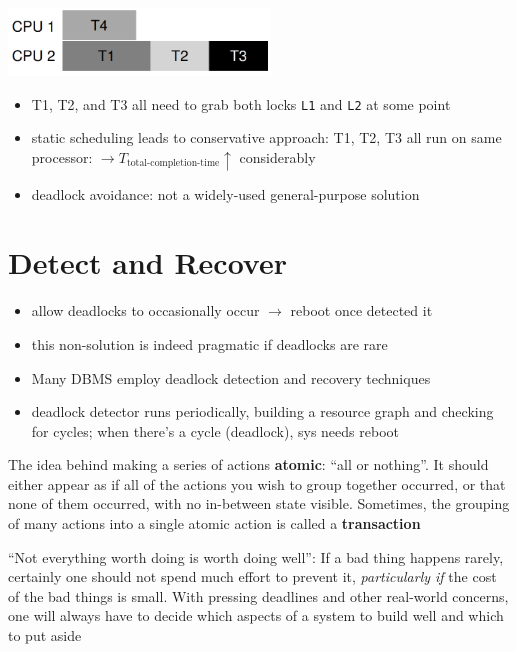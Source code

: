 \begin{minipage}{.6\linewidth}
  \includegraphics[width=\linewidth,height=1.8cm]{imgs/threadsdeadlock3}
\end{minipage}
\begin{itemize}
\item T1, T2, and T3 all need to grab both locks \texttt{L1} and \texttt{L2} at some point
\item static scheduling leads to conservative approach: T1, T2, T3 all run on same processor: $\to T_{\text{total-completion-time}} \uparrow$ considerably
\item deadlock avoidance: not a widely-used general-purpose solution
\end{itemize}
\section*{Detect and Recover}
\begin{itemize}
\item allow deadlocks to occasionally occur $\to$ reboot once detected it
\item this non-solution is indeed pragmatic if deadlocks are rare
\item Many DBMS employ deadlock detection and recovery techniques
\item deadlock detector runs periodically, building a resource graph and checking for cycles; when there's a cycle (deadlock), sys needs reboot
\end{itemize}
\begin{tcolorbox}[left=0mm, top=1mm, right=0mm, rightlower=0mm, bottom=1mm,
  title=USE ATOMIC OPERATIONS,
  halign title=center]
  The idea behind making a series of actions \textbf{atomic}: ``all or nothing''. It should either appear as if all of the actions you wish to group together occurred, or that none of them occurred, with no in-between state visible. Sometimes, the grouping of many actions into a single atomic action is called a \textbf{transaction}
\end{tcolorbox}
\begin{tcolorbox}[left=0mm, top=1mm, right=0mm, rightlower=0mm, bottom=1mm,
  title= DON'T ALWAYS DO IT PERFECTLY (TOM WEST'S LAW),
  halign title=center]
  ``Not everything worth doing is worth doing well'': If a bad thing happens rarely, certainly one should not spend much effort to prevent it, \emph{particularly if} the cost of the bad things is small. With pressing deadlines and other real-world concerns, one will always have to decide which aspects of a system to build well and which to put aside
\end{tcolorbox}

